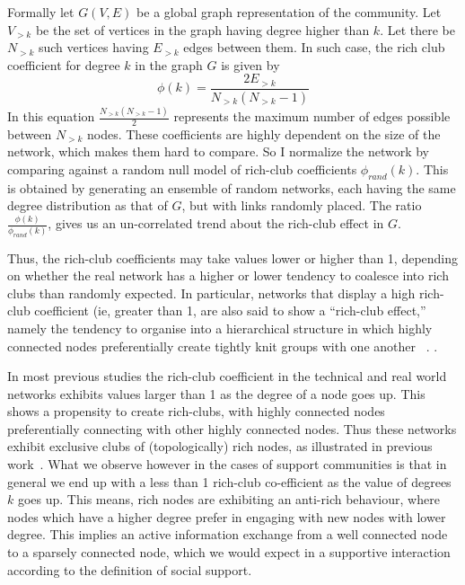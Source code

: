 Formally let $G(V,E)$ be a global graph representation of the community. Let $V_{>k}$ be the set of vertices in the graph having degree higher than $k$. Let there be $N_{>k}$ such vertices having $E_{>k}$ edges between them. In such case, the rich club coefficient for degree $k$ in the graph $G$ is given by 
\begin{equation}
 \phi(k) = \frac{2E_{>k}}{N_{>k}(N_{>k} - 1)}
 \label{eq:rich_club}
\end{equation}
In this equation $\frac{N_{>k}(N_{>k} - 1)}{2}$ represents the maximum number of edges possible between $N_{>k}$ nodes. These coefficients are highly dependent on the size of the network, which makes them hard to compare. So I normalize the network by comparing against a random null model of rich-club coefficients $\phi_{rand}(k)$. This is obtained by generating an ensemble of random networks, each having the same degree distribution as that of $G$, but with links randomly placed. The ratio $\frac{\phi(k)}{\phi_{rand}(k)}$, gives us an un-correlated trend about the rich-club effect in $G$. 

Thus, the rich-club coefficients may take values lower or higher than 1, depending on whether the real network has a higher or lower tendency to coalesce into rich clubs than randomly expected. In particular, networks that display a high rich-club coefficient (ie, greater than 1, are also said to show a “rich-club effect,” namely the tendency to organise into a hierarchical structure in which highly connected nodes preferentially create tightly knit groups with one another ~\cite{mcauley2007rich}. .

In most previous studies the rich-club coefficient in the technical and real world networks exhibits values larger than 1 as the degree of a node goes up. This shows a propensity to create rich-clubs, with highly connected nodes preferentially connecting with other highly connected nodes. Thus these networks exhibit exclusive clubs of (topologically) rich nodes, as illustrated in previous work~\cite{zhou2004rich,colizza2006detecting}. What we observe however in the cases of support communities is that in general we end up with a less than 1 rich-club co-efficient as the value of degrees $k$ goes up. This means, rich nodes are exhibiting an anti-rich behaviour, where nodes which have a higher degree prefer in engaging with new nodes with lower degree. This implies an active information exchange from a well connected node to a sparsely connected node, which we would expect in a supportive interaction according to the definition of social support.


